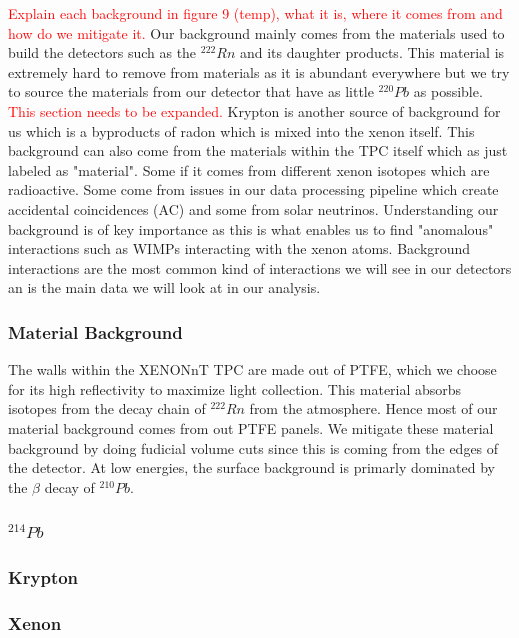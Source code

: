 \documentclass[12pt]{article}
\begin{document}
\textcolor{red}{Explain each background in figure 9 (temp), what it is, where it comes from and how do we mitigate it.}
Our background mainly comes from the materials used to build the detectors such as the  $^{222}Rn$ and its daughter products. This material is extremely hard to remove from materials as it is abundant everywhere but we try to source the materials from our detector that have as little $^{220}Pb$ as possible.
\textcolor{red}{This section needs to be expanded.} Krypton is another source of background for us which is a byproducts of radon which is mixed into the xenon itself. This background can also come from the materials within the TPC itself which as just labeled as "material". Some if it comes from different xenon isotopes which are radioactive. Some come from issues in our data processing pipeline which create accidental coincidences (AC) and some from solar neutrinos. Understanding our background is of key importance as this is what enables us to find "anomalous"  interactions such as WIMPs interacting with the xenon atoms. Background interactions are the most common kind of interactions we will see in our detectors an is the main data we will look at in our analysis.

\subsubsection*{Material Background}

The walls within the XENONnT TPC are made out of PTFE, which we choose for its high reflectivity to maximize light collection. This material absorbs isotopes from the decay chain of $^{222}Rn$ from the atmosphere. Hence most of our material background comes from out PTFE panels. We mitigate these material background by doing fudicial volume cuts since this is coming from the edges of the detector. At low energies, the surface background is primarly dominated by the $\beta$ decay of $^{210}Pb$.

\subsubsection*{$^{214}Pb$}

\subsubsection*{Krypton}

\subsubsection*{Xenon}
\end{document}
